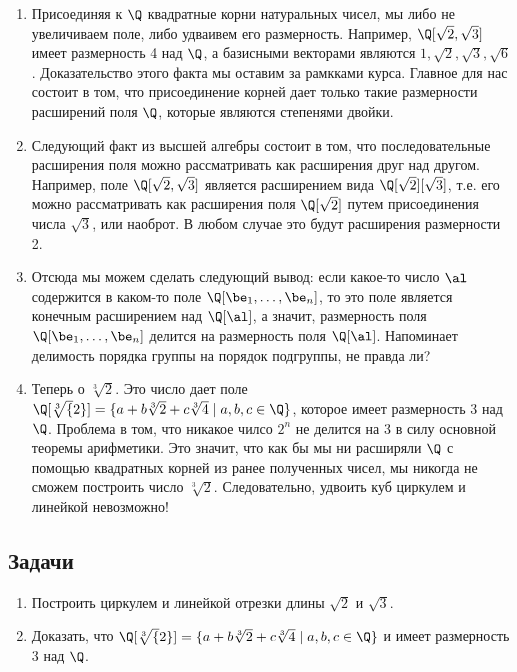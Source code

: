 \begin{enumerate}
\item Присоединяя к $\Q$ квадратные корни натуральных чисел, мы либо не увеличиваем поле, либо удваивем его размерность. Например, $\Q[\sqrt 2,\sqrt 3]$ имеет размерность 4 над $\Q$, а базисными векторами являются $1,\sqrt 2,\sqrt 3,\sqrt 6$. Доказательство этого факта мы оставим за рамкками курса. Главное для нас состоит в том, что присоединение корней дает только такие размерности расширений поля $\Q$, которые являются степенями двойки.

\item Следующий факт из высшей алгебры состоит в том, что последовательные расширения поля можно рассматривать как расширения друг над другом. Например, поле $\Q[\sqrt 2,\sqrt 3]$ является расширением вида $\Q[\sqrt 2][\sqrt 3]$, т.е. его можно рассматривать как расширения поля $\Q[\sqrt 2]$ путем присоединения числа $\sqrt 3$, или наоброт. В любом случае это будут расширения размерности 2.

\item Отсюда мы можем сделать следующий вывод: если какое-то число $\al$ содержится в каком-то поле $\Q[\be_1,\dots,\be_n]$, то это поле является конечным расширением над $\Q[\al]$, а значит, размерность поля $\Q[\be_1,\dots,\be_n]$ делится на размерность поля $\Q[\al]$. Напоминает делимость порядка группы на порядок подгруппы, не правда ли?

\item Теперь о $\sqrt[3]{2}$. Это число дает поле $\Q[\sqrt[3]{2}]=\{a+b\sqrt[3]{2}+c\sqrt[3]{4}\mid a,b,c\in\Q\}$, которое имеет размерность 3 над $\Q$. Проблема в том, что никакое чилсо $2^n$ не делится на 3 в силу основной теоремы арифметики. Это значит, что как бы мы ни расширяли $\Q$ с помощью квадратных корней из ранее полученных чисел, мы никогда не сможем построить число $\sqrt[3]{2}$. Следовательно, удвоить куб циркулем и линейкой невозможно!
\end{enumerate}


\subsection*{Задачи}

\begin{enumerate}
\item Построить циркулем и линейкой отрезки длины $\sqrt 2$ и $\sqrt 3$.
\item Доказать, что $\Q[\sqrt[3]{2}]=\{a+b\sqrt[3]{2}+c\sqrt[3]{4}\;|\;a,b,c\in\Q\}$ и имеет размерность 3 над $\Q$.
\end{enumerate}





